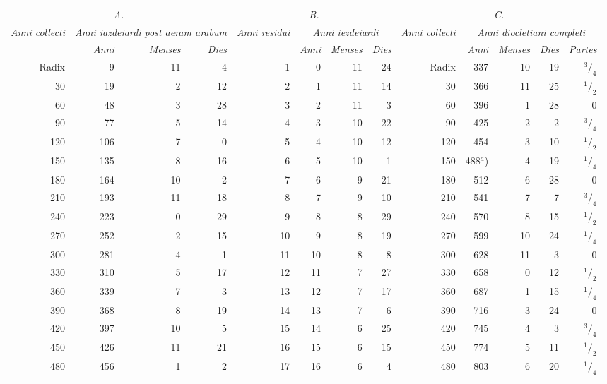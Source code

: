\documentclass[11pt]{article}
\begin{document}
\begin{center}\scriptsize\begin{tabular}{rrrr|rrrr|rrrrr}
\multicolumn{4}{c}{\emph{A.\footnotemarkT{}}} & \multicolumn{4}{c}{\emph{B.}} & \multicolumn{5}{c}{\emph{C.}} \\
\emph{Anni collecti} & \multicolumn{3}{c}{\emph{Anni iazdeiardi post aeram arabum}} & \emph{Anni residui} & \multicolumn{3}{c}{\emph{Anni iezdeiardi}} & \emph{Anni collecti} & \multicolumn{4}{c}{\emph{Anni diocletiani completi}} \\
 & \emph{Anni} & \emph{Menses} & \emph{Dies} &  & \emph{Anni} & \emph{Menses} & \emph{Dies} &  & \emph{Anni} & \emph{Menses} & \emph{Dies} & \emph{Partes} \\
Radix & 9 & 11 & 4 & 1 & 0 & 11 & 24 & Radix & 337 & 10 & 19 & $^{3}/_{4}$ \\
30 & 19 & 2 & 12 & 2 & 1 & 11 & 14 & 30 & 366 & 11 & 25 & $^{1}/_{2}$ \\
60 & 48 & 3 & 28 & 3 & 2 & 11 & 3 & 60 & 396 & 1 & 28 & 0 \\
90 & 77 & 5 & 14 & 4 & 3 & 10 & 22 & 90 & 425 & 2 & 2 & $^{3}/_{4}$ \\
120 & 106 & 7 & 0 & 5 & 4 & 10 & 12 & 120 & 454 & 3 & 10 & $^{1}/_{2}$ \\
150 & 135 & 8 & 16 & 6 & 5 & 10 & 1 & 150 & 488$^{a}$) & 4 & 19 & $^{1}/_{4}$ \\
180 & 164 & 10 & 2 & 7 & 6 & 9 & 21 & 180 & 512 & 6 & 28 & 0 \\
210 & 193 & 11 & 18 & 8 & 7 & 9 & 10 & 210 & 541 & 7 & 7 & $^{3}/_{4}$ \\
240 & 223 & 0 & 29 & 9 & 8 & 8 & 29 & 240 & 570 & 8 & 15 & $^{1}/_{2}$ \\
270 & 252 & 2 & 15 & 10 & 9 & 8 & 19 & 270 & 599 & 10 & 24 & $^{1}/_{4}$ \\
300 & 281 & 4 & 1 & 11 & 10 & 8 & 8 & 300 & 628 & 11 & 3 & 0 \\
330 & 310 & 5 & 17 & 12 & 11 & 7 & 27 & 330 & 658 & 0 & 12 & $^{1}/_{2}$ \\
360 & 339 & 7 & 3 & 13 & 12 & 7 & 17 & 360 & 687 & 1 & 15 & $^{1}/_{4}$ \\
390 & 368 & 8 & 19 & 14 & 13 & 7 & 6 & 390 & 716 & 3 & 24 & 0 \\
420 & 397 & 10 & 5 & 15 & 14 & 6 & 25 & 420 & 745 & 4 & 3 & $^{3}/_{4}$ \\
450 & 426 & 11 & 21 & 16 & 15 & 6 & 15 & 450 & 774 & 5 & 11 & $^{1}/_{2}$ \\
480 & 456 & 1 & 2 & 17 & 16 & 6 & 4 & 480 & 803 & 6 & 20 & $^{1}/_{4}$ \\

\end{tabular}
\end{center}
\end{document}
